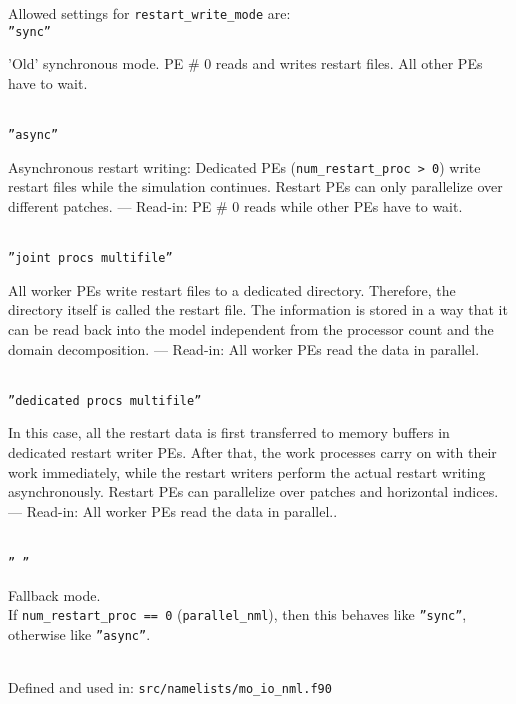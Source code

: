 Allowed settings for \texttt{restart\_write\_mode} are:\\[1em]
\texttt{''sync''} \\
\hspace*{2em} 
\parbox{0.8\textwidth}{\raggedright%
  'Old' synchronous mode. PE \# 0 reads and writes restart files. All other PEs have to wait.}\\[1em]
%
\texttt{''async''} \\
\hspace*{2em} 
\parbox{0.8\textwidth}{\raggedright%
  Asynchronous restart writing:
  Dedicated PEs (\texttt{num\_restart\_proc > 0}) write restart files
  while the simulation continues.  Restart PEs can only parallelize
  over different patches. --- Read-in: PE \# 0 reads while other PEs
  have to wait.  } \\[1em]
%
\texttt{''joint procs multifile''} \\
\hspace*{2em} 
\parbox{0.8\textwidth}{\raggedright%
  All worker PEs write restart files to a dedicated
  directory. Therefore, the directory itself is called the restart
  file.  The information is stored in a way that it can be read back
  into the model independent from the processor count and the domain
  decomposition. --- Read-in: All worker PEs read the data in parallel.
 }\\[1em]
%
\texttt{''dedicated procs multifile''} \\
\hspace*{2em} 
\parbox{0.8\textwidth}{\raggedright%

  In this case, all the restart data is first transferred to memory
  buffers in dedicated restart writer PEs.  After that, the work
  processes carry on with their work immediately, while the restart
  writers perform the actual restart writing asynchronously.  Restart
  PEs can parallelize over patches and horizontal indices.
  --- Read-in: All worker PEs read the data in parallel..
}\\[1em]
%
\texttt{'' ''} \\
\hspace*{2em} 
\parbox{0.8\textwidth}{\raggedright%
  Fallback mode. \\ If \texttt{num\_restart\_proc == 0} (\texttt{parallel\_nml}),
  then this behaves like \texttt{''sync''}, otherwise like \texttt{''async''}.
}\\[1em]

Defined and used in: \verb+src/namelists/mo_io_nml.f90+


